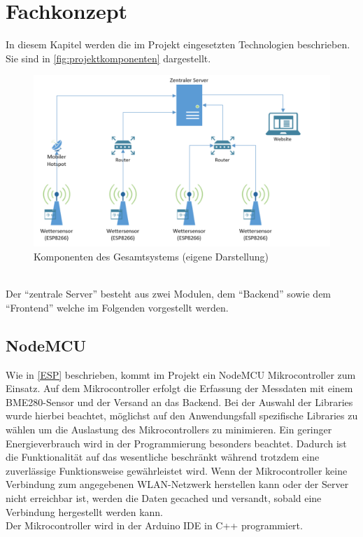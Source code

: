 

\section{Fachkonzept}
In diesem Kapitel werden die im Projekt eingesetzten Technologien beschrieben. Sie sind in \autoref{fig:projektkomponenten} dargestellt. \\
\begin{figure}[h]
    \centering
    \includegraphics[width=0.7\linewidth]{img/projektkomponenten}
    \caption[Komponenten des Gesamtsystems]{Komponenten des Gesamtsystems (eigene Darstellung)}
    \label{fig:projektkomponenten}
\end{figure}
\\
Der \enquote{zentrale Server} besteht aus zwei Modulen, dem \enquote{Backend} sowie dem \enquote{Frontend} welche im Folgenden vorgestellt werden.

\subsection{NodeMCU}
Wie in \autoref{ESP} beschrieben, kommt im Projekt ein NodeMCU Mikrocontroller zum Einsatz.
Auf dem Mikrocontroller erfolgt die Erfassung der Messdaten mit einem BME280-Sensor und der Versand an das Backend.
Bei der Auswahl der Libraries wurde hierbei beachtet, möglichst auf den Anwendungsfall spezifische Libraries zu wählen um die Auslastung des Mikrocontrollers zu minimieren.
Ein geringer Energieverbrauch wird in der Programmierung besonders beachtet.
Dadurch ist die Funktionalität auf das wesentliche beschränkt während trotzdem eine zuverlässige Funktionsweise gewährleistet wird.
Wenn der Mikrocontroller keine Verbindung zum angegebenen WLAN-Netzwerk herstellen kann oder der Server nicht erreichbar ist, werden die Daten gecached und versandt, sobald eine Verbindung hergestellt werden kann.\\
Der Mikrocontroller wird in der Arduino IDE in C++ programmiert.

